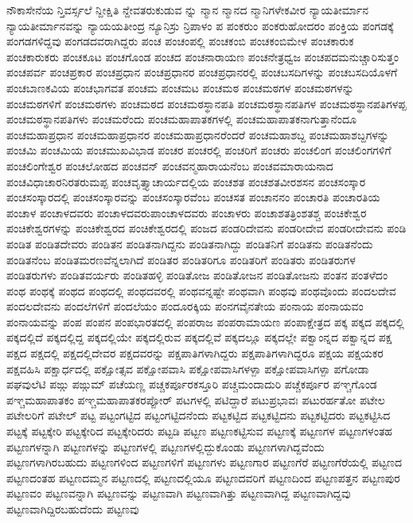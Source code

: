 {ನೌಕಾಸೇನೆಯ
ನ್ತಿವರ್ಸ್ಸಲೆ
ನ್ದೀಕ್ಷಿತಿ
ನ್ದೇವತರುಕುಡುವ
ನ್ನು
ನ್ಮಾನ
ನ್ಮಾನದ
ನ್ಮಾನಿಗಳೇಕವೀರ
ನ್ಯಾಯತೀರ್ಮಾನ
ನ್ಯಾಯತೀರ್ಮಾನವನ್ನು
ನ್ಯಾಯಯತೀಂದ್ರ
ನ್ಯೂನಿಸ್ರು
ನ್ರಿಪಾಳಂ
ಪ
ಪಂಕರುಂ
ಪಂಕರುಹೋದರಂ
ಪಂಕ್ತಿಯ
ಪಂಗಡಕ್ಕೆ
ಪಂಗಡಗಳಿದ್ದವು
ಪಂಗಡದವರಾಗಿದ್ದರು
ಪಂಚ
ಪಂಚಂಪಲ್ಲಿ
ಪಂಚಕಂಬಿ
ಪಂಚಕಂಬಿಮೇಳ
ಪಂಚಕಾರುಕ
ಪಂಚಕಾರುಕರು
ಪಂಚಕೂಟ
ಪಂಚಗೊಂಡ
ಪಂಚದ
ಪಂಚನಾರಾಯಣ
ಪಂಚನೇತ್ರಧ್ವಜ
ಪಂಚಪದಮನುಚ್ಚಾರಿಸುತ್ತಂ
ಪಂಚಪರ್ವ
ಪಂಚಪ್ರಕಾರ
ಪಂಚಪ್ರಧಾನ
ಪಂಚಪ್ರಧಾನರ
ಪಂಚಪ್ರಧಾನರಲ್ಲಿ
ಪಂಚಬಸದಿಗಳನ್ನು
ಪಂಚಬಸದಿಯೊಳಗೆ
ಪಂಚಬಾಣಕವಿಯ
ಪಂಚಭಾಗವತ
ಪಂಚಮ
ಪಂಚಮಟ
ಪಂಚಮಠ
ಪಂಚಮಠಗಳ
ಪಂಚಮಠಗಳನ್ನು
ಪಂಚಮಠಗಳಿಗೆ
ಪಂಚಮಠಗಳು
ಪಂಚಮಠದ
ಪಂಚಮಠಸ್ಥಾನಪತಿ
ಪಂಚಮಠಸ್ಥಾನಪತಿಗಳ
ಪಂಚಮಠಸ್ಥಾನಪತಿಗಳಪ್ಪ
ಪಂಚಮಠಸ್ಥಾನಪತಿಗಳು
ಪಂಚಮರೆಂದು
ಪಂಚಮಹಾಪಾತಕಗಳಲ್ಲಿ
ಪಂಚಮಹಾಪಾತಕನಾಗುತ್ತಾನೆಂದೂ
ಪಂಚಮಹಾಪ್ರಧಾನ
ಪಂಚಮಹಾಪ್ರಧಾನರ
ಪಂಚಮಹಾಪ್ರಧಾನರೆಂದರೆ
ಪಂಚಮಹಾಶಬ್ದ
ಪಂಚಮಹಾಶಬ್ದಗಳನ್ನು
ಪಂಚಮಿ
ಪಂಚಮಿಯ
ಪಂಚಮುಖವಿಭಾಡ
ಪಂಚರ
ಪಂಚರಲ್ಲಿ
ಪಂಚರಿಗೆ
ಪಂಚರು
ಪಂಚಲಿಂಗ
ಪಂಚಲಿಂಗಗಳಿಗೆ
ಪಂಚಲಿಂಗೇಶ್ವರ
ಪಂಚಲೋಹದ
ಪಂಚವನ್
ಪಂಚವನ್ಮಹಾರಾಯನೆಂಬ
ಪಂಚವಮಾರಾಯನಾದ
ಪಂಚವಿಧಾಚಾರನಿರತರುಮಪ್ಪ
ಪಂಚವೃತ್ತ್ಯಾಚಾರ್ಯದಲ್ಲಿಯ
ಪಂಚಶತ
ಪಂಚಶತವೀರಶಸನ
ಪಂಚಸಂಸ್ಕಾರ
ಪಂಚಸಂಸ್ಕಾರದಲ್ಲಿ
ಪಂಚಸಂಸ್ಕಾರವನ್ನು
ಪಂಚಸಂಸ್ಕಾರವೆಂಬ
ಪಂಚಸತ
ಪಂಚಾನನಂ
ಪಂಚಾರತಿ
ಪಂಚಾರತಿಯ
ಪಂಚಾಳ
ಪಂಚಾಳದವರು
ಪಂಚಾಳದವರುಪಾಂಚಾಳದವರು
ಪಂಚಾಳರು
ಪಂಚಾಶತತ್ರಿಂಶತಶ್ಚ
ಪಂಚಿಕೇಶ್ವರ
ಪಂಚಿಕೇಶ್ವರಗಳನ್ನು
ಪಂಚಿಕೇಶ್ವರದ
ಪಂಚಿಕೇಶ್ವರದಲ್ಲಿ
ಪಂಜದ
ಪಂಡರಿದೇವನು
ಪಂಡರೀದೇವ
ಪಂಡರೀದೇವನು
ಪಂಡಿ
ಪಂಡಿತ
ಪಂಡಿತದೇವರು
ಪಂಡಿತನ
ಪಂಡಿತನಾಗಿದ್ದನು
ಪಂಡಿತನಾಗಿದ್ದು
ಪಂಡಿತನಿಗೆ
ಪಂಡಿತನು
ಪಂಡಿತನೆಂದು
ಪಂಡಿತನೆಂಬ
ಪಂಡಿತಮರಣವೆನ್ನಲಾಗಿದೆ
ಪಂಡಿತರ
ಪಂಡಿತರಿಗೂ
ಪಂಡಿತರಿಗೆ
ಪಂಡಿತರು
ಪಂಡಿತರುಗಳ
ಪಂಡಿತರುಗಳು
ಪಂಡಿತವರ್ಯರು
ಪಂಡಿತಹಳ್ಳಿ
ಪಂಡಿತೋಜ
ಪಂಡಿತೋಜನ
ಪಂಡಿತೋಜನು
ಪಂತನ
ಪಂತಳೆದಂ
ಪಂಥ
ಪಂಥಕ್ಕೆ
ಪಂಥದ
ಪಂಥದಲ್ಲಿ
ಪಂಥದವರಲ್ಲಿ
ಪಂಥವನ್ನಷ್ಟೇ
ಪಂಥವಾಗಿ
ಪಂಥವು
ಪಂಥವೊಂದು
ಪಂದಲದೇವ
ಪಂದಲದೇವನು
ಪಂದಲೆಗಳಿಗೆ
ಪಂದಲೆಯಂ
ಪಂದೂರಕ್ಕಿಯ
ಪಂನಗವೈನತೇಯ
ಪಂನಾಯ
ಪಂನಾಯವಂ
ಪಂನಾಯವನ್ನು
ಪಂಪ
ಪಂಪನ
ಪಂಪಭಾರತದಲ್ಲಿ
ಪಂಪರಾಜ
ಪಂಪರಾಮಾಯಣ
ಪಂಪಾಕ್ಷೇತ್ರದ
ಪಕ್ಕ
ಪಕ್ಕದ
ಪಕ್ಕದಲ್ಲಿ
ಪಕ್ಕದಲ್ಲಿದೆ
ಪಕ್ಕದಲ್ಲಿದ್ದ
ಪಕ್ಕದಲ್ಲಿಯೇ
ಪಕ್ಕದಲ್ಲಿರುವ
ಪಕ್ಕದಲ್ಲಿವೆ
ಪಕ್ಕದಲ್ಲೂ
ಪಕ್ಕದಲ್ಲೇ
ಪಕ್ವಾಂನ್ನದ
ಪಕ್ವಾನ್ನದ
ಪಕ್ಷ
ಪಕ್ಷದ
ಪಕ್ಷದಲ್ಲಿ
ಪಕ್ಷದಲ್ಲಿದೇವರ
ಪಕ್ಷದವರನ್ನು
ಪಕ್ಷಪಾತಿಗಳಾಗಿದ್ದರು
ಪಕ್ಷಪಾತಿಗಳಾಗಿದ್ದರೂ
ಪಕ್ಷಯ
ಪಕ್ಷಯಕರ
ಪಕ್ಷವಹಿಸಿ
ಪಕ್ಷಾರ್ಧದಲ್ಲಿ
ಪಕ್ಷೋತ್ಸವ
ಪಕ್ಷೋಪವಾಸಿ
ಪಕ್ಷೋಪವಾಸಿಗಳಳ್ಪಾ
ಪಕ್ಷೋಪವಾಸಿಗಳ್ಪಾ
ಪಗೋಡಾ
ಪಘವುಲೆಟಿ
ಪಙ್ಗು
ಪಙ್ಗುಮ್
ಪಚೆಯಣ್ಣ
ಪಚ್ಚಕರ್ಪೂರಕಸ್ತೂರಿ
ಪಚ್ಚಮಂದಾದುರಿ
ಪಚ್ಚೆಕರ್ಪೂರ
ಪಞ್ಚಗೊಂಡ
ಪಞ್ಚಮಹಾಪಾತಕಂ
ಪಞ್ಚಮಹಾಪಾತಕರಪ್ಪೋರ್
ಪಟಗಳಲ್ಲಿ
ಪಟಿದ್ದಾರೆ
ಪಟುಪ್ರಭಾವಃ
ಪಟುರರ್ಹತೋ
ಪಟೇಲ
ಪಟೇಲರಿಗೆ
ಪಟೇಲ್
ಪಟ್ಟ
ಪಟ್ಟಂಗಟ್ಟಿದ
ಪಟ್ಟಂಗಟ್ಟಿದನೆಂದು
ಪಟ್ಟಕಟ್ಟಿದ
ಪಟ್ಟಕಟ್ಟಿದನು
ಪಟ್ಟಕಟ್ಟಿದರು
ಪಟ್ಟಕಟ್ಟಿಸಿದ
ಪಟ್ಟಕ್ಕೆ
ಪಟ್ಟಕ್ಕೇರಿ
ಪಟ್ಟಕ್ಕೇರಿದ
ಪಟ್ಟಕ್ಕೇರಿದರು
ಪಟ್ಟಡಿ
ಪಟ್ಟಣ
ಪಟ್ಟಣಕಟ್ಟಿಸುವ
ಪಟ್ಟಣಕ್ಕೆ
ಪಟ್ಟಣಗಳ
ಪಟ್ಟಣಗಳಂತಹ
ಪಟ್ಟಣಗಳನ್ನಾಗಿ
ಪಟ್ಟಣಗಳನ್ನು
ಪಟ್ಟಣಗಳಲ್ಲಿ
ಪಟ್ಟಣಗಳಲ್ಲಿದ್ದುಕೊಂಡು
ಪಟ್ಟಣಗಳಾಗಿದ್ದವೆಂದು
ಪಟ್ಟಣಗಳಾಗಿರಬಹುದು
ಪಟ್ಟಣಗಳಿಂದ
ಪಟ್ಟಣಗಳಿಗೆ
ಪಟ್ಟಣಗಳು
ಪಟ್ಟಣಗಾರ
ಪಟ್ಟಣಗೆರೆ
ಪಟ್ಟಣಗೆರೆಯಲ್ಲಿ
ಪಟ್ಟಣದ
ಪಟ್ಟಣದಂತಹ
ಪಟ್ಟಣದಮ್ಮನ
ಪಟ್ಟಣದಲ್ಲಿ
ಪಟ್ಟಣದಲ್ಲಿಯೂ
ಪಟ್ಟಣದವರಿಗೆ
ಪಟ್ಟಣದಿಂದ
ಪಟ್ಟಣಪತ್ತನ
ಪಟ್ಟಣಪುರ
ಪಟ್ಟಣವಂ
ಪಟ್ಟಣವನ್ನಾಗಿ
ಪಟ್ಟಣವನ್ನು
ಪಟ್ಟಣವಾಗಿ
ಪಟ್ಟಣವಾಗಿತ್ತು
ಪಟ್ಟಣವಾಗಿದ್ದ
ಪಟ್ಟಣವಾಗಿದ್ದವು
ಪಟ್ಟಣವಾಗಿದ್ದಿರಬಹುದೆಂದು
ಪಟ್ಟಣವು
}
